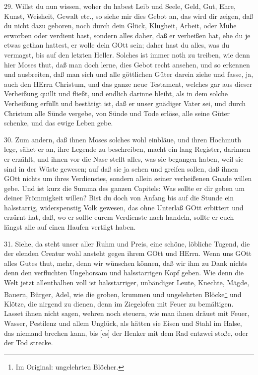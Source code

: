 29. Willst du nun wissen, woher du habest Leib und Seele, Geld, Gut, Ehre, Kunst, Weisheit, Gewalt etc., so siehe mir dies Gebot an, das wird dir zeigen, daß du nicht dazu geboren, noch durch dein Glück, Klugheit, Arbeit, oder Mühe erworben oder verdient hast, sondern alles daher, daß er verheißen hat, ehe du je etwas gethan hattest, er wolle dein GOtt sein; daher hast du alles, was du vermagst, bis auf den letzten Heller. Solches ist immer noth zu treiben, wie denn hier Moses thut, daß man doch lerne, dies Gebot recht ansehen, und so erkennen und ausbreiten, daß man sich und alle göttlichen Güter darein ziehe und fasse, ja, auch den HErrn Christum, und das ganze neue Testament, welches gar aus dieser Verheißung quillt und fließt, und endlich darinne bleibt, als in dem solche Verheißung erfüllt und bestätigt ist, daß er unser gnädiger Vater sei, und durch Christum alle Sünde vergebe, von Sünde und Tode erlöse, alle seine Güter schenke, und das ewige Leben gebe.

30. Zum andern, daß ihnen Moses solches wohl einbläue, und ihren Hochmuth lege, sähet er an, ihre Legende zu beschreiben, macht ein lang Register, darinnen er erzählt, und ihnen vor die Nase stellt alles, was sie begangen haben, weil sie sind in der Wüste gewesen; auf daß sie ja sehen und greifen sollen, daß ihnen GOtt nichts um ihres Verdienstes, sondern allein seiner verheißenen Gnade willen gebe. Und ist kurz die Summa des ganzen Capitels: Was sollte er dir geben um deiner Frömmigkeit willen? Bist du doch von Anfang bis auf die Stunde ein halsstarrig, widerspenstig Volk gewesen, das ohne Unterlaß GOtt erbittert und erzürnt hat, daß, wo er sollte eurem Verdienste nach handeln, sollte er euch längst alle auf einen Haufen vertilgt haben.

31. Siehe, da steht unser aller Ruhm und Preis, eine schöne, löbliche Tugend, die der elenden Creatur wohl ansteht gegen ihrem GOtt und HErrn. Wenn uns GOtt alles Gutes thut, mehr, denn wir wünschen können, daß wir ihm zu Dank nichts denn den verfluchten Ungehorsam und halsstarrigen Kopf geben. Wie denn die Welt jetzt allenthalben voll ist halsstarriger, unbändiger Leute, Knechte, Mägde, Bauern, Bürger, Adel, wie die groben, krummen und ungelehrten Blöcke\footnote{Im Original: ungelehrten Blöcher.} und Klötze, die nirgend zu dienen, denn im Ziegelofen mit Feuer zu bemältigen. Lasset ihnen nicht sagen, wehren noch steuern, wie man ihnen dräuet mit Feuer, Wasser, Pestilenz und allem Unglück, als hätten sie Eisen und Stahl im Halse, das niemand brechen kann, bis [es] der Henker mit dem Rad entzwei stoße, oder der Tod strecke.

